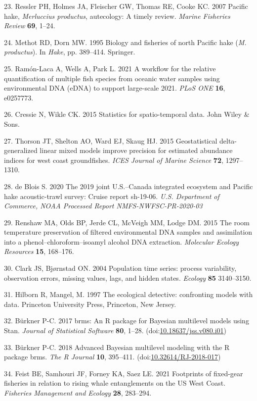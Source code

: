 \documentclass[
]{article}
\begin{document}
23. Ressler PH, Holmes JA, Fleischer GW, Thomas RE, Cooke KC. 2007
Pacific hake, \textit{Merluccius productus}, autecology: A timely review.
\emph{Marine Fisheries Review} \textbf{69}, 1--24.

24. Methot RD, Dorn MW. 1995 Biology and fisheries of north Pacific hake
(\textit{M. productus}). In \emph{Hake}, pp. 389--414. Springer.

25. Ramón-Laca A, Wells A, Park L. 2021 A workflow for the relative
quantification of multiple fish species from oceanic water samples using
environmental DNA (eDNA) to support large-scale 2021. \emph{PLoS ONE}
\textbf{16}, e0257773.

26. Cressie N, Wikle CK. 2015 Statistics for spatio-temporal data. John Wiley \& Sons.

27. Thorson JT, Shelton AO, Ward EJ, Skaug HJ. 2015 Geostatistical
delta-generalized linear mixed models improve precision for estimated
abundance indices for west coast groundfishes. \emph{ICES Journal of
Marine Science} \textbf{72}, 1297--1310.

28. de Blois S. 2020 The 2019 joint U.S.--Canada integrated ecosystem
and Pacific hake acoustic-trawl survey: Cruise report sh-19-06.
\emph{U.S. Department of Commerce, NOAA Processed Report
NMFS-NWFSC-PR-2020-03}

29. Renshaw MA, Olds BP, Jerde CL, McVeigh MM, Lodge DM. 2015 The room
temperature preservation of filtered environmental DNA samples and
assimilation into a phenol--chloroform--isoamyl alcohol DNA extraction.
\emph{Molecular Ecology Resources} \textbf{15}, 168--176.

30. Clark JS, Bj{\o}rnstad ON. 2004 Population time series: 
process variability, observation errors, missing values, lags, and hidden states.
 \emph{Ecology} \textbf{85} 3140--3150.

31. Hilborn R, Mangel, M. 1997 The ecological detective: confronting models with data.
Princeton University Press, Princeton, New Jersey.

32. Bürkner P-C. 2017 brms: An R package for Bayesian multilevel models
using Stan. \emph{Journal of Statistical Software} \textbf{80}, 1--28.
(doi:\href{https://doi.org/10.18637/jss.v080.i01}{10.18637/jss.v080.i01})

33. Bürkner P-C. 2018 Advanced Bayesian multilevel modeling with the R
package brms. \emph{The R Journal} \textbf{10}, 395--411.
(doi:\href{https://doi.org/10.32614/RJ-2018-017}{10.32614/RJ-2018-017})

34. Feist BE, Samhouri JF, Forney KA, Saez LE. 2021 Footprints of
fixed-gear fisheries in relation to rising whale entanglements on the US
West Coast. \emph{Fisheries Management and Ecology} \textbf{28},
283--294.
\end{document}
